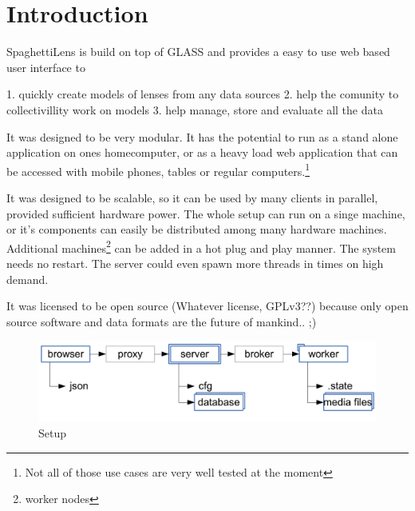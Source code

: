 \section{Introduction}

SpaghettiLens is build on top of GLASS and provides a easy to use web based user interface to

1. quickly create models of lenses from any data sources
2. help the comunity to collectivillity work on models
3. help manage, store and evaluate all the data

It was designed to be very modular. It has the potential to run as a stand alone application on ones homecomputer, or as a heavy load web application that can be accessed with mobile phones, tables or regular computers.\footnote{Not all of those use cases are very well tested at the moment}

It was designed to be scalable, so it can be used by many clients in parallel, provided sufficient hardware power. The whole setup can run on a singe machine, or it's components can easily be distributed among many hardware machines. Additional machines\footnote{worker nodes} can be added in a hot plug and play manner. The system needs no restart. The server could even spawn more threads in times on high demand.

It was licensed to be open source (Whatever license, GPLv3??) because only open source software and data formats are the future of mankind.. ;)




\begin{figure}[htbp]
  \centering
    \includegraphics[width=\figwidth]{fig/pipeline.pdf}
  \caption{\spl Setup}
  \label{fig:pipeline2}
\end{figure}